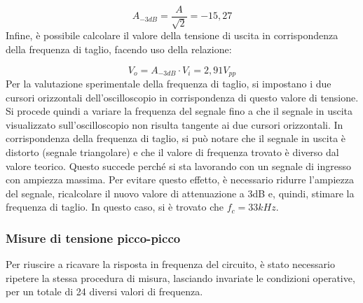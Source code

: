 \[A_{-3dB}=\frac{A}{\sqrt{2}}=-15,27\]
Infine, è possibile calcolare il valore della tensione di uscita in corrispondenza della frequenza di
taglio, facendo uso della relazione:

\[V_o=A_{-3dB} \cdot V_i=2,91V_{pp}\]
Per la valutazione sperimentale della frequenza di taglio, si impostano i due cursori orizzontali dell’oscilloscopio in corrispondenza di questo valore di tensione. Si procede quindi a variare la frequenza del segnale fino a che il segnale in uscita visualizzato sull’oscilloscopio non risulta tangente ai due cursori orizzontali. In corrispondenza della frequenza di taglio, si può notare che il segnale in uscita è distorto (segnale triangolare) e che il valore di frequenza trovato è diverso dal valore teorico. Questo succede perché si sta lavorando con un segnale di ingresso con ampiezza massima. Per evitare questo effetto, è necessario ridurre l’ampiezza del segnale, ricalcolare il nuovo valore di attenuazione a 3dB e, quindi, stimare la frequenza di taglio. In questo caso, si è trovato che \(f_c=33kHz\).
\clearpage
\subsubsection{Misure di tensione picco-picco}

Per riuscire a ricavare la risposta in frequenza del circuito, è stato necessario ripetere la stessa procedura di misura, lasciando invariate le condizioni operative, per un totale di 24 diversi valori di frequenza.

